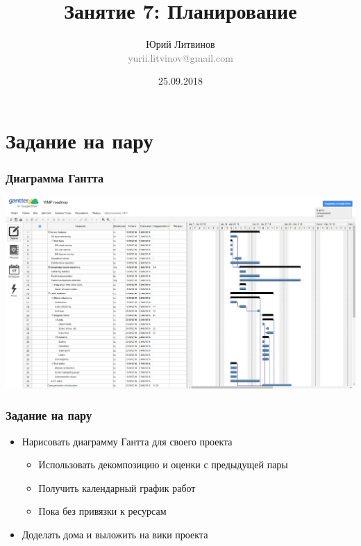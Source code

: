 \documentclass[xetex,mathserif,serif]{beamer}
\title{Занятие 7: Планирование}
\author[Юрий Литвинов]{Юрий Литвинов\\\small{\textcolor{gray}{yurii.litvinov@gmail.com}}}
\date{25.09.2018}
\begin{document}
	\frame{\titlepage}

	\section{Задание на пару}

	\begin{frame}
		\frametitle{Диаграмма Гантта}
		\begin{center}
			\includegraphics[width=\textwidth]{gantter.png}
		\end{center}
	\end{frame}

	\begin{frame}
		\frametitle{Задание на пару}
		\begin{itemize}
			\item Нарисовать диаграмму Гантта для своего проекта
			\begin{itemize}
				\item Использовать декомпозицию и оценки с предыдущей пары
				\item Получить календарный график работ
				\item Пока без привязки к ресурсам
			\end{itemize}
			\item Доделать дома и выложить на вики проекта
		\end{itemize}
	\end{frame}
\end{document}
